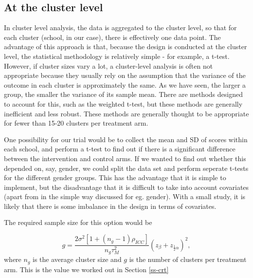 \documentclass[
  openany]{book}
\theoremstyle{definition}
\theoremstyle{definition}
\theoremstyle{definition}
\theoremstyle{definition}
\theoremstyle{remark}
\begin{document}
\hypertarget{at-the-cluster-level}{%
\subsection{At the cluster level}\label{at-the-cluster-level}}

In cluster level analysis, the data is aggregated to the cluster level, so that for each cluster (school, in our case), there is effectively one data point. The advantage of this approach is that, because the design is conducted at the cluster level, the statistical methodology is relatively simple - for example, a t-test. However, if cluster sizes vary a lot, a cluster-level analysis is often not appropriate because they usually rely on the assumption that the variance of the outcome in each cluster is approximately the same. As we have seen, the larger a group, the smaller the variance of its sample mean. There are methods designed to account for this, such as the weighted t-test, but these methods are generally inefficient and less robust. These methods are generally thought to be appropriate for fewer than 15-20 clusters per treatment arm.

One possibility for our trial would be to collect the mean and SD of scores within each school, and perform a t-test to find out if there is a significant difference between the intervention and control arms. If we wanted to find out whether this depended on, say, gender, we could split the data set and perform seperate t-tests for the different gender groups. This has the advantage that it is simple to implement, but the disadvantage that it is difficult to take into account covariates (apart from in the simple way discussed for eg. gender). With a small study, it is likely that there is some imbalance in the design in terms of covariates.

The required sample size for this option would be

\[
g = \frac{2 \sigma^2 \left[1+ \left(n_g-1\right)\rho_{ICC}\right]}{n_g\tau^2_M}\left(z_{\beta} + z_{\frac{1}{2}\alpha}\right)^2,
\]
where \(n_g\) is the average cluster size and \(g\) is the number of clusters per treatment arm. This is the value we worked out in Section \ref{ss-crt}
\end{document}
